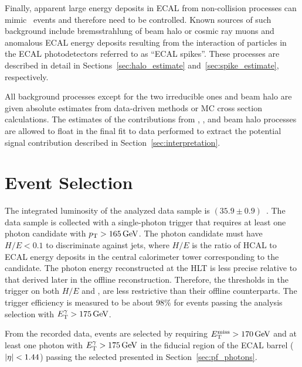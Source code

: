 Finally, apparent large energy deposits in ECAL from non-collision processes can mimic \gmet\  events and therefore need to be controlled. 
Known sources of such background include bremsstrahlung of beam halo or cosmic ray muons and anomalous ECAL energy deposits resulting from the interaction of particles in the ECAL photodetectors referred to as ``ECAL spikes''. 
These processes are described in detail in Sections~\ref{sec:halo_estimate} and~\ref{sec:spike_estimate}, respectively.

All background processes except for the two irreducible ones and beam halo are given absolute estimates from data-driven methods or MC cross section calculations. 
The estimates of the contributions from \zinvg, \wlng, and beam halo processes are allowed to float in the final fit to data performed to extract the potential signal contribution described in Section~\ref{sec:interpretation}.

\section{Event Selection}
\label{sec:event_selection}


The integrated luminosity of the analyzed data sample is $(35.9\pm0.9)$\fbinv~\cite{CMS:2017sdi}. 
The data sample is collected with a single-photon trigger that requires at least one photon candidate with $p_{\mathrm{T}} > 165\,\text{Ge\hspace{-.08em}V}$. 
The photon candidate must have $H/E < 0.1$ to discriminate against jets, where $H/E$ is the ratio of HCAL to ECAL energy deposits in the central calorimeter tower corresponding to the candidate.
The photon energy reconstructed at the HLT is less precise relative to that derived later in the offline reconstruction. 
Therefore, the thresholds in the trigger on both $H/E$ and \ETg, are less restrictive than their offline counterparts.  
The trigger efficiency is measured to be about 98\% for events passing the analysis selection with $E_{\mathrm{T}}^{\gamma} > 175\,\text{Ge\hspace{-.08em}V}$.

From the recorded data, events are selected by requiring $E_{\mathrm{T}}^{\text{miss}} > 170\,\text{Ge\hspace{-.08em}V}$ and at least one photon with $E_{\mathrm{T}}^{\gamma} > 175\,\text{Ge\hspace{-.08em}V}$ in the fiducial region of the ECAL barrel ($\lvert \eta \rvert < 1.44$) passing the selected presented in Section~\ref{sec:pf_photons}. 

